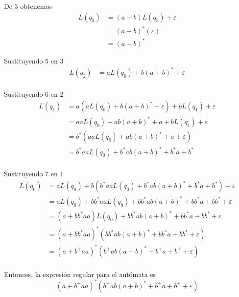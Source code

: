 \documentclass{article}
\begin{document}
    De $3$ obtenemos
    \begin{equation}
    \begin{aligned}
      L(q_3) &= (a + b)L(q_3) + \varepsilon \\
            &= (a + b)^* (\varepsilon) \\
            &= (a + b)^* 
    \end{aligned}
    \end{equation}

    Sustituyendo $5$ en $3$
    \begin{equation}
    \begin{aligned}
      L(q_2) &= aL(q_0) + b(a+b)^* + \varepsilon \\
    \end{aligned}
    \end{equation}

    Sustituyendo $6$ en $2$
    \begin{equation}
    \begin{aligned}
      L(q_1) &= a(aL(q_0) + b(a+b)^* + \varepsilon) + bL(q_1) + \varepsilon \\
            &= aaL(q_0) + ab(a+b)^* + a + bL(q_1) + \varepsilon \\
            &= b^* (aaL(q_0) + ab(a+b)^* + a + \varepsilon )\\
            &= b^*aaL(q_0) + b^*ab(a+b)^* + b^*a + b^* \\
    \end{aligned}
    \end{equation}

    Sustituyendo $7$ en $1$
    \begin{equation}
    \begin{aligned}
      L(q_0) &= aL(q_0) + b(b^*aaL(q_0) + b^*ab(a+b)^* + b^*a + b^* ) + \varepsilon \\
            &= aL(q_0) + bb^*aaL(q_0) + bb^*ab(a+b)^* + bb^*a + bb^* + \varepsilon \\
            &= (a + bb^*aa)L(q_0) + bb^*ab(a+b)^* + bb^*a + bb^* + \varepsilon \\
            &= (a + bb^*aa)^* (bb^*ab(a+b)^* + bb^*a + bb^* + \varepsilon)\\
            &= (a + b^+aa)^* (b^+ab(a+b)^* + b^+a + b^+ + \varepsilon)\\
    \end{aligned}
    \end{equation}

    Entonces, la expresión regular para el autómata es 
    $$\boxed{(a + b^+aa)^* (b^+ab(a+b)^* + b^+a + b^+ + \varepsilon)}$$
\end{document}
